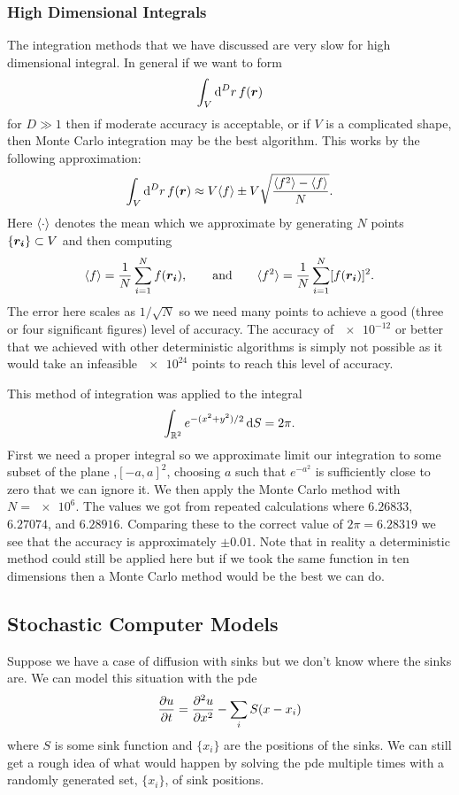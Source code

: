 \documentclass[a4paper]{article}
\begin{document}
    \subsubsection{High Dimensional Integrals}
    The integration methods that we have discussed are very slow for high dimensional integral.
    In general if we want to form
    \[\int_V \dd[D]{r} f(\bm{r})\]
    for \(D \gg 1\) then if moderate accuracy is acceptable, or if \(V\) is a complicated shape, then Monte Carlo integration may be the best algorithm.
    This works by the following approximation:
    \[\int_V \dd[D]{r} f(\bm{r}) \approx V\langle{f}\rangle \pm V\sqrt{\frac{\langle{f^2}\rangle - \langle{f}\rangle}{N}}.\]
    Here \(\langle{\cdot}\rangle\) denotes the mean which we approximate by generating \(N\) points \(\{\bm{r_i}\} \subset V\) and then computing
    \[\langle{f}\rangle = \frac{1}{N}\sum_{i=1}^{N} f(\bm{r_i}), \qquad\text{and}\qquad \langle{f^2}\rangle = \frac{1}{N}\sum_{i=1}^{N} [f(\bm{r_i})]^2.\]
    The error here scales as \(1/\sqrt{N}\) so we need many points to achieve a good (three or four significant figures) level of accuracy.
    The accuracy of \(\num{e-12}\) or better that we achieved with other deterministic algorithms is simply not possible as it would take an infeasible \(\num{e24}\) points to reach this level of accuracy.
    
    This method of integration was applied to the integral
    \[\int_{\mathbb{R}^2}e^{-(x^2 + y^2)/2} \dd{S} = 2\pi.\]
    First we need a proper integral so we approximate limit our integration to some subset of the plane ,\([-a, a]^2\), choosing \(a\) such that \(e^{-a^2}\) is sufficiently close to zero that we can ignore it.
    We then apply the Monte Carlo method with \(N = \num{e6}\).
    The values we got from repeated calculations where \(6.26833\), \(6.27074\), and \(6.28916\).
    Comparing these to the correct value of \(2\pi = 6.28319\) we see that the accuracy is approximately \(\pm0.01\).
    Note that in reality a deterministic method could still be applied here but if we took the same function in ten dimensions then a Monte Carlo method would be the best we can do.
    
    \subsection{Stochastic Computer Models}
    Suppose we have a case of diffusion with sinks but we don't know where the sinks are.
    We can model this situation with the \gls{pde}
    \[\pdv{u}{t} = \pdv[2]{u}{x} - \sum_{i}S(x - x_i)\]
    where \(S\) is some sink function and \(\{x_i\}\) are the positions of the sinks.
    We can still get a rough idea of what would happen by solving the \gls{pde} multiple times with a randomly generated set, \(\{x_i\}\), of sink positions.
    
\end{document}
